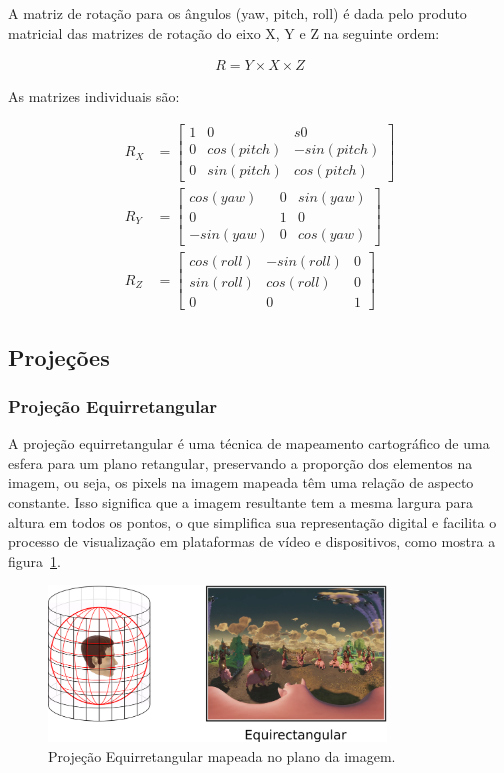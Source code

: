 A matriz de rotação para os ângulos (yaw, pitch, roll) é dada pelo produto matricial das matrizes de rotação do eixo X, Y e Z na seguinte ordem:

\begin{align*}
R=Y\times X\times Z
\end{align*}

As matrizes individuais são:

\begin{align*}
R_X &=\begin{bmatrix}
1 & 0 & s0\\
0 & cos(pitch) & -sin(pitch)\\
0 & sin(pitch) & cos(pitch)
\end{bmatrix}
\\
R_Y &=\begin{bmatrix}
cos(yaw) & 0 & sin(yaw)\\
0 & 1 & 0\\
-sin(yaw) & 0 & cos(yaw)
\end{bmatrix}
\\
R_Z &=\begin{bmatrix}
cos(roll) & -sin(roll) & 0\\
sin(roll) & cos(roll) & 0\\
0 & 0 & 1
\end{bmatrix}
\end{align*}


\subsection{Projeções}

\subsubsection{Projeção Equirretangular}

A projeção equirretangular é uma técnica de mapeamento cartográfico de uma esfera para um plano retangular, preservando a proporção dos elementos na imagem, ou seja, os pixels na imagem mapeada têm uma relação de aspecto constante. Isso significa que a imagem resultante tem a mesma largura para altura em todos os pontos, o que simplifica sua representação digital e facilita o processo de visualização em plataformas de vídeo e dispositivos, como mostra a figura~\ref{fig:erp}.


\begin{figure}
    \centering
    \includegraphics[width=0.8\textwidth]{fig/erp.png}
    \caption{Projeção Equirretangular mapeada no plano da imagem.}
    \label{fig:erp}
\end{figure}

